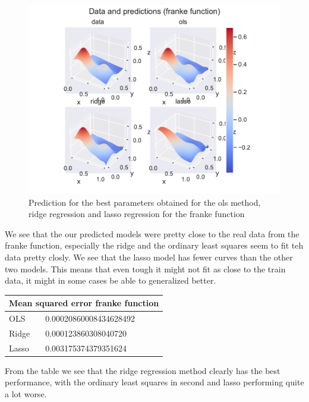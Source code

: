 \documentclass[12pt]{article}
\begin{document}
\begin{figure}[H]
    \centering
    \includegraphics[width=\columnwidth]{../src/output/prediction_all_models_franke_function.pdf}
    \caption{Prediction for the best parameters obtained for the ols method, ridge regression and lasso regression for the franke function}
    \label{fig:predictions_franke_function}
\end{figure}
We see that the our predicted models were pretty close to the real data from the franke function, especially the ridge and the ordinary least squares seem to fit teh data pretty closly.
We see that the lasso model has fewer curves than the other two models.
This means that even tough it might not fit as close to the train data, it might in some cases be able to generalized better.


\vspace{0.5em}
\begin{tabular}{ |p{3cm}||p{6cm}|  }
 \hline
 \multicolumn{2}{|c|}{Mean squared error franke function} \\
 \hline
 OLS & 0.00020860008434628492  \\
 \hline
Ridge & 0.000123860308040720\\
\hline
Lasso  & 0.003175374379351624\\
\hline
\end{tabular}

\vspace{0.5em}

From the table we see that the ridge regression method clearly has the best performance, with the ordinary least squares in second and lasso performing quite a lot worse.
\end{document}
